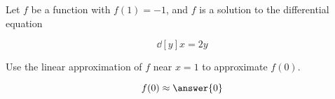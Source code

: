 \documentclass{ximera}
\author{Steven Gubkin}
\begin{document}
\begin{exercise}



Let $f$ be a function with $f(1) = -1$, and $f$ is a solution to the differential equation 

\[
\dd[y]{x} = 2y
\]

Use the linear approximation of $f$ near $x=1$ to approximate $f(0)$. 

\begin{prompt}
	\[
	f(0) \approx \answer{0}
	\]
\end{prompt}

\end{exercise}
\end{document}
